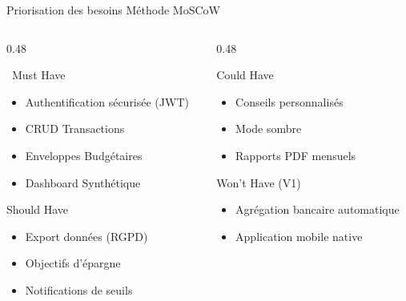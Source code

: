 \documentclass[aspectratio=169]{beamer}
\begin{document}
\begin{frame}{Priorisation des besoins  Méthode MoSCoW}
  \begin{columns}[t]
    \begin{column}{0.48\textwidth}
      \begin{alertblock}{\faCheckDouble\ Must Have}
        \begin{itemize}
          \item Authentification sécurisée (JWT)
          \item CRUD Transactions
          \item Enveloppes Budgétaires
          \item Dashboard Synthétique
        \end{itemize}
      \end{alertblock}
      \vspace{0.3cm}
      \begin{block}{Should Have}
        \begin{itemize}
          \item Export données (RGPD)
          \item Objectifs d'épargne
          \item Notifications de seuils
        \end{itemize}
      \end{block}
    \end{column}
    \begin{column}{0.48\textwidth}
      \begin{block}{Could Have}
        \begin{itemize}
          \item Conseils personnalisés
          \item Mode sombre
          \item Rapports PDF mensuels
        \end{itemize}
      \end{block}
      \vspace{0.3cm}
      \begin{block}{Won't Have (V1)}
        \begin{itemize}
          \item Agrégation bancaire automatique
          \item Application mobile native
        \end{itemize}
      \end{block}
    \end{column}
  \end{columns}
\end{frame}
\end{document}
